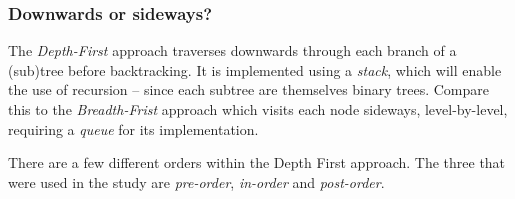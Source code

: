 \documentclass[a4paper, 11pt]{article}
\begin{document}
    \subsubsection*{Downwards or sideways?}

    The \emph{Depth-First} approach traverses downwards through each branch of a (sub)tree
    before backtracking. It is implemented using a \emph{stack}, which will enable 
    the use of recursion -- since each subtree are themselves binary trees. Compare
    this to the \emph{Breadth-Frist} approach which visits each node sideways,
    level-by-level, requiring a \emph{queue} for its implementation.
    
    There are a few different orders within the Depth First approach. 
    The three that were used in the study are 
    \emph{pre-order}, \emph{in-order} and \emph{post-order}. 
\end{document}

